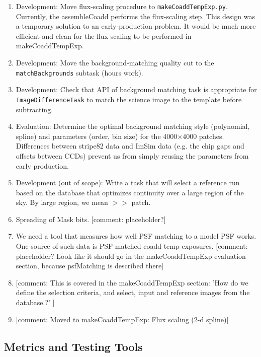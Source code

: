 \documentclass[12pt]{article}
\newcommand{\comment}[1]{{\color{cyan} [{comment: #1}]}}
\begin{document}
\begin{enumerate}
\item Development: Move flux-scaling procedure to {\tt makeCoaddTempExp.py}.  Currently, the assembleCoadd performs the flux-scaling step. This design was a temporary solution to an early-production problem.  It would be much more efficient and clean for the flux scaling to be performed in makeCoaddTempExp.

\item Development:  Move the background-matching quality cut to the {\tt matchBackgrounds} subtask (hours work).

\item Development:  Check that API of background matching task is appropriate for {\tt ImageDifferenceTask} to match the science image to the template before subtracting. 

\item Evaluation: Determine the optimal background matching style (polynomial, spline) and parameters (order, bin size) for the 4000$\times$4000 patches. Differences between stripe82 data and ImSim data (e.g. the chip gaps and offsets between CCDs) prevent us from simply reusing the parameters from early production.

\item Development (out of scope): Write a task that will select a reference run based on the database that optimizes continuity over a large region of the sky. By large region, we mean $>>$ patch. 

\item Spreading of Mask bits.  \comment{placeholder?}

\item We need a tool that measures how well PSF matching to a model PSF
works. One source of such data is PSF-matched coadd temp exposures. \comment{placeholder? Look like it should go in the makeCoaddTempExp evaluation section, because psfMatching is described there}

\item \comment{This is covered in the makeCoaddTempExp section:  'How do we define the selection criteria, and select, input and reference images from the database.?' }

\item \comment{Moved to makeCoaddTempExp: Flux scaling (2-d spline)}

\end{enumerate}

\subsection{Metrics and Testing Tools}
\end{document}
